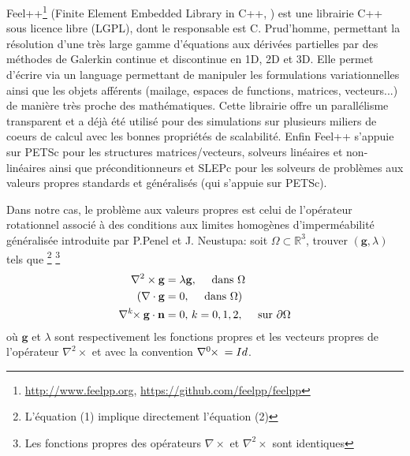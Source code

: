 \documentclass[12pt]{article}
\newcommand{\curlk}[1][k]{\ensuremath{\nabla^{#1}\hspace{-.3em}\times}\xspace}
\begin{document}
Feel++\footnote{\url{http://www.feelpp.org}, \url{https://github.com/feelpp/feelpp}} (Finite Element Embedded Library in
C++, \cite{prud2012feel++,feelpp098:10046} ) est une librairie C++ sous licence
libre (LGPL), dont le responsable est C. Prud'homme, permettant la résolution
d'une très large gamme d'équations aux dérivées partielles par des méthodes de
Galerkin continue et discontinue en 1D, 2D et 3D. Elle permet d'écrire via un
language permettant de manipuler les formulations variationnelles ainsi que les
objets afférents (mailage, espaces de functions, matrices, vecteurs...) de
manière très proche des mathématiques. Cette librairie offre un parallélisme
transparent et a déjà été utilisé pour des simulations sur plusieurs miliers de
coeurs de calcul avec les bonnes propriétés de scalabilité. Enfin Feel++
s'appuie sur PETSc pour les structures matrices/vecteurs, solveurs linéaires et
non-linéaires ainsi que préconditionneurs et SLEPc pour les solveurs de
problèmes aux valeurs propres standards et généralisés (qui s'appuie sur PETSc).

Dans notre cas, le problème aux valeurs propres est celui de l'opérateur rotationnel
associé à des conditions aux limites homogènes d'imperméabilité généralisée introduite
par P.Penel et J. Neustupa\cite{Penel2004}: soit
$\Omega \subset \mathbb{R}^3$, trouver $(\mathbf{g},\lambda)$ tels que
\footnote{L'équation (1) implique directement l'équation (2)}
\footnote{Les fonctions propres des opérateurs $\nabla \times$ et $\nabla^2 \times$
sont identiques}
\begin{align}
\label{eq:0}
\nabla^2 \times \mathbf{g} &= \lambda \mathbf{g},\quad \mbox{ dans } \Omega\\
(\nabla \cdot \mathbf{g} &= 0,\quad \mbox{ dans } \Omega )\\
\curlk{} \mathbf{g} \cdot \mathbf{n} &= 0,\, k=0,1,2,\quad \mbox{ sur
} \partial \Omega
\end{align}
où $\mathbf{g}$ et $\lambda$ sont respectivement les fonctions propres et les
 vecteurs propres de l'opérateur $\nabla^2 \times$ et avec la convention
$\curlk[0]{} = Id$.
\end{document}
